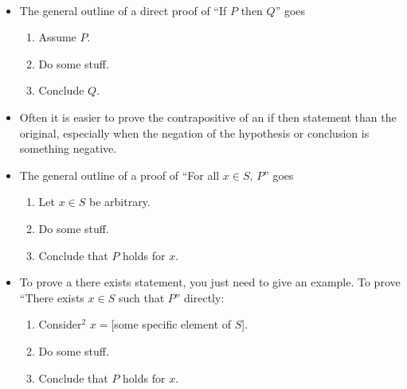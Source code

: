 \documentclass[12pt]{amsart}
\numberwithin{equation}{section}
\theoremstyle{plain} %
\theoremstyle{definition}
\theoremstyle{remark}
\begin{document}
\

\begin{framed}
\begin{itemize}
\item The general outline of a direct proof of ``If $P$ then $Q$'' goes
\begin{enumerate}
\item Assume $P$.
\item Do some stuff.
\item Conclude $Q$.
\end{enumerate}
\item Often it is easier to prove the contrapositive of an if then statement than the original, especially when the negation of the hypothesis or conclusion is something negative.
\item The general outline of a proof of ``For all $x\in S$, $P$'' goes
\begin{enumerate}
\item Let $x\in S$ be arbitrary.
\item Do some stuff.
\item Conclude that $P$ holds for $x$.
\end{enumerate}
\item To prove a there exists statement, you just need to give an example. To prove ``There exists $x\in S$ such that $P$'' directly:
\begin{enumerate}
\item Consider$^{\textrm{2}}$ $x=$[some specific element of $S$].
\item Do some stuff.
\item Conclude that $P$ holds for $x$.
\end{enumerate}


\end{itemize}

\end{framed}

\
\renewcommand{\thefootnote}{}
\end{document}
